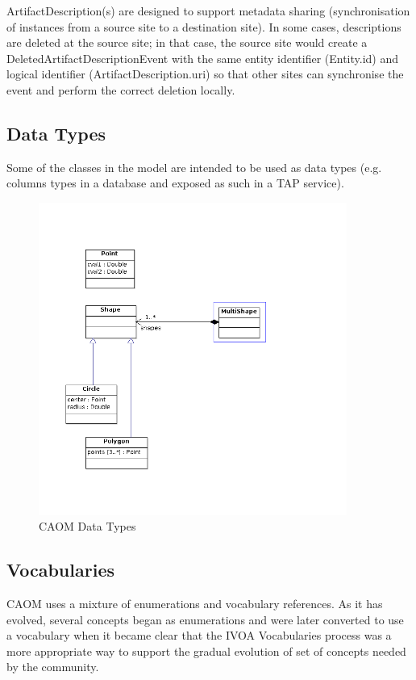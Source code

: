 \documentclass[11pt,a4paper]{ivoa}
\begin{document}
ArtifactDescription(s) are designed to support metadata sharing (synchronisation of instances
from a source site to a destination site). In some cases, descriptions are deleted at the 
source site; in that case, the source site would create a DeletedArtifactDescriptionEvent with 
the same entity identifier (Entity.id) and logical identifier (ArtifactDescription.uri) so that 
other sites can synchronise the event and perform the correct deletion locally.

\subsection{Data Types}
Some of the classes in the model are intended to be used as data types (e.g. columns
types in a database and exposed as such in a TAP service).

\begin{figure}
\centering
\includegraphics[width=0.9\textwidth]{src/uml/CAOM2datatypes.png}
\caption{CAOM Data Types}
\label{fig:datatypes}
\end{figure}

\subsection{Vocabularies}

CAOM uses a mixture of enumerations and vocabulary references. As it has evolved,
several concepts began as enumerations and were later converted to use a vocabulary
when it became clear that the IVOA Vocabularies process was a more appropriate way
to support the gradual evolution of set of concepts needed by the community.
\end{document}
